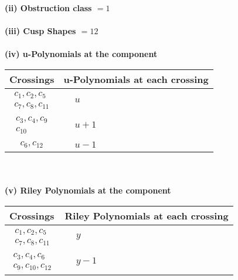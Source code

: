 \documentclass[1p]{elsarticle_modified}
\theoremstyle{definition}
\begin{document}
\flushleft \textbf{(ii) Obstruction class $= 1$}\\~\\
\flushleft \textbf{(iii) Cusp Shapes $= 12$}\\~\\
\newpage\renewcommand{\arraystretch}{1}
\flushleft \textbf{(iv) u-Polynomials at the component}\newline \\
\begin{tabular}{m{50pt}|m{274pt}}
Crossings & \hspace{64pt}u-Polynomials at each crossing \\
\hline $$\begin{aligned}c_{1},c_{2},c_{5}\\c_{7},c_{8},c_{11}\end{aligned}$$&$\begin{aligned}
&u
\end{aligned}$\\
\hline $$\begin{aligned}c_{3},c_{4},c_{9}\\c_{10}\end{aligned}$$&$\begin{aligned}
&u+1
\end{aligned}$\\
\hline $$\begin{aligned}c_{6},c_{12}\end{aligned}$$&$\begin{aligned}
&u-1
\end{aligned}$\\
\hline
\end{tabular}\\~\\
\newpage\renewcommand{\arraystretch}{1}
\flushleft \textbf{(v) Riley Polynomials at the component}\newline \\
\begin{tabular}{m{50pt}|m{274pt}}
Crossings & \hspace{64pt}Riley Polynomials at each crossing \\
\hline $$\begin{aligned}c_{1},c_{2},c_{5}\\c_{7},c_{8},c_{11}\end{aligned}$$&$\begin{aligned}
&y
\end{aligned}$\\
\hline $$\begin{aligned}c_{3},c_{4},c_{6}\\c_{9},c_{10},c_{12}\end{aligned}$$&$\begin{aligned}
&y-1
\end{aligned}$\\
\hline
\end{tabular}\\~\\
\end{document}
